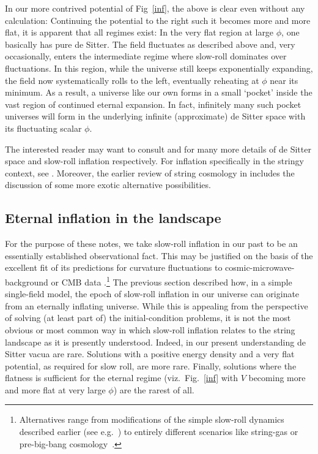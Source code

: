 \documentclass[12pt]{article}
\numberwithin{equation}{section}
\begin{document}
In our more contrived potential of Fig~\ref{inf}, the above is clear even without any calculation: Continuing the potential to the right such it becomes more and more flat, it is apparent that all regimes exist: In the very flat region at large $\phi$, one basically has pure de Sitter. The field fluctuates as described above and, very occasionally, enters the intermediate regime where slow-roll dominates over fluctuations. In this region, while the universe still keeps exponentially expanding, the field now systematically rolls to the left, eventually reheating at $\phi$ near its minimum. As a result, a universe like our own forms in a small `pocket' inside the vast region of continued eternal expansion. In fact, infinitely many such pocket universes will form in the underlying infinite (approximate) de Sitter space with its fluctuating scalar $\phi$. 

The interested reader may want to consult \cite{Spradlin:2001pw} and \cite{Mukhanov:2005sc, Riotto:2002yw} for many more details of de Sitter space and slow-roll inflation respectively. For inflation specifically in the stringy context, see \cite{Baumann:2014nda, Westphal:2014ana}. Moreover, the earlier review of string cosmology in \cite{Quevedo:2002xw} includes the discussion of some more exotic alternative possibilities.






\subsection{Eternal inflation in the landscape}
For the purpose of these notes, we take slow-roll inflation in our past to be an essentially established observational fact. This may be justified on the basis of the excellent fit of its predictions for curvature fluctuations to cosmic-microwave-background or CMB data \cite{Akrami:2018odb}.\footnote{
Alternatives 
range from modifications of the simple slow-roll dynamics described earlier (see e.g.~\cite{Berera:1995ie, Lyth:2001nq, Alishahiha:2004eh}) to entirely different scenarios like string-gas or pre-big-bang cosmology~\cite{Brandenberger:1988aj, Gasperini:1992em}.
}
The previous section described how, in a simple single-field model, the epoch of slow-roll inflation in our universe can originate from an eternally inflating universe. While this is appealing from the perspective of solving (at least part of) the initial-condition problems, it is not the most obvious or most common way in which slow-roll inflation relates to the string landscape as it is presently understood. Indeed, in our present understanding de Sitter vacua are rare. Solutions with a positive energy density and a very flat potential, as required for slow roll, are more rare. Finally, solutions where the flatness is sufficient for the eternal regime (viz.~Fig.~\ref{inf} with $V$ becoming more and more flat at very large $\phi$) are the rarest of all. 
\end{document}

